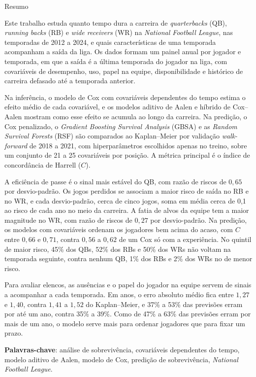 \clearpage{\thispagestyle{empty}\origcleardoublepage}
\thispagestyle{empty}
\begin{center}
{\LARGE Resumo}
\end{center}
\medskip

Este trabalho estuda quanto tempo dura a carreira de \textit{quarterbacks} (QB), \textit{running backs} (RB) e \textit{wide receivers} (WR) na \textit{National Football League}, nas temporadas de 2012 a 2024, e quais características de uma temporada acompanham a saída da liga. Os dados formam um painel anual por jogador e temporada, em que a saída é a última temporada do jogador na liga, com covariáveis de desempenho, uso, papel na equipe, disponibilidade e histórico de carreira defasado até a temporada anterior.

Na inferência, o modelo de Cox com covariáveis dependentes do tempo estima o efeito médio de cada covariável, e os modelos aditivo de Aalen e híbrido de Cox--Aalen mostram como esse efeito se acumula ao longo da carreira. Na predição, o Cox penalizado, o \textit{Gradient Boosting Survival Analysis} (GBSA) e as \textit{Random Survival Forests} (RSF) são comparados ao Kaplan--Meier por validação \textit{walk-forward} de 2018 a 2021, com hiperparâmetros escolhidos apenas no treino, sobre um conjunto de 21 a 25 covariáveis por posição. A métrica principal é o índice de concordância de Harrell ($C$).

A eficiência de passe é o sinal mais estável do QB, com razão de riscos de $0{,}65$ por desvio-padrão. Os jogos perdidos se associam a maior risco de saída no RB e no WR, e cada desvio-padrão, cerca de cinco jogos, soma em média cerca de 0,1 ao risco de cada ano no meio da carreira. A fatia de alvos da equipe tem a maior magnitude no WR, com razão de riscos de $0{,}27$ por desvio-padrão. Na predição, os modelos com covariáveis ordenam os jogadores bem acima do acaso, com $C$ entre $0{,}66$ e $0{,}71$, contra $0{,}56$ a $0{,}62$ de um Cox só com a experiência. No quintil de maior risco, 45\% dos QBs, 52\% dos RBs e 50\% dos WRs não voltam na temporada seguinte, contra nenhum QB, 1\% dos RBs e 2\% dos WRs no de menor risco.

Para avaliar elencos, as ausências e o papel do jogador na equipe servem de sinais a acompanhar a cada temporada. Em anos, o erro absoluto médio fica entre $1{,}27$ e $1{,}40$, contra $1{,}41$ a $1{,}52$ do Kaplan--Meier, e 37\% a 53\% das previsões erram por até um ano, contra 35\% a 39\%. Como de 47\% a 63\% das previsões erram por mais de um ano, o modelo serve mais para ordenar jogadores que para fixar um prazo.

\medskip
\noindent\textbf{Palavras-chave}: análise de sobrevivência, covariáveis dependentes do tempo, modelo aditivo de Aalen, modelo de Cox, predição de sobrevivência, \textit{National Football League}.
